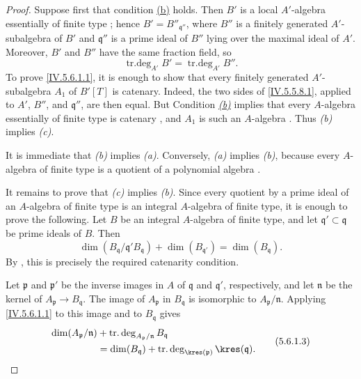 \begin{proof}
Suppose first that condition
{\hyperref[IV.5.6.1.b]{\textup{(b)}}} holds.  Then $B'$ is a local
$A'$-algebra essentially of finite type ; hence $B'=B''_{\mathfrak q''}$,
where $B''$ is a finitely generated $A'$-subalgebra of $B'$ and
$\mathfrak q''$ is a prime ideal of $B''$ lying over the maximal
ideal of $A'$.  Moreover, $B'$ and $B''$ have the same fraction
field, so
\[
\operatorname{tr.deg}_{A'}B'
 =\operatorname{tr.deg}_{A'}B''.
\]
To prove \eqref{IV.5.6.1.1}, it is enough to show that every
finitely generated $A'$-subalgebra $A_1$ of $B'[T]$ is catenary.
Indeed, the two sides of \eqref{IV.5.5.8.1}, applied to $A'$, $B''$,
and $\mathfrak q''$, are then equal.  But
Condition {\hyperref[IV.5.6.1.b]{\emph{(b)}}} implies that every
$A$-algebra essentially of
finite type is catenary , and $A_1$ is such an
$A$-algebra .  Thus \emph{(b)} implies \emph{(c)}.

It is immediate that \emph{(b)} implies \emph{(a)}.  Conversely, \emph{(a)} implies \emph{(b)},
because every $A$-algebra of finite type is a quotient of a
polynomial algebra .

It remains to prove that \emph{(c)} implies \emph{(b)}.  Since every quotient by a
prime ideal of an $A$-algebra of finite type is an integral
$A$-algebra of finite type, it is enough to prove the following.
Let $B$ be an integral $A$-algebra of finite type, and let
$\mathfrak q'\subset\mathfrak q$ be prime ideals of $B$.  Then
\begin{equation}
\dim(B_{\mathfrak q}/\mathfrak q'B_{\mathfrak q})
 +\dim(B_{\mathfrak q'})
 =\dim(B_{\mathfrak q}).
\tag{5.6.1.2}\label{IV.5.6.1.2}
\end{equation}
By , this is precisely the required catenarity
condition.


Let $\mathfrak p$ and $\mathfrak p'$ be the inverse images in $A$ of
$\mathfrak q$ and $\mathfrak q'$, respectively, and let
$\mathfrak n$ be the kernel of $A_{\mathfrak p}\longrightarrow B_{\mathfrak q}$.
The image of $A_{\mathfrak p}$ in $B_{\mathfrak q}$ is isomorphic to
$A_{\mathfrak p}/\mathfrak n$.  Applying
\eqref{IV.5.6.1.1} to this image and to $B_{\mathfrak q}$ gives
\begin{equation}
\begin{split}
\dim(A_{\mathfrak p}/\mathfrak n)
 &+\operatorname{tr.deg}_{A_{\mathfrak p}/\mathfrak n}
       B_{\mathfrak q}\\
 &=\dim(B_{\mathfrak q})
   +\operatorname{tr.deg}_{\kres(\mathfrak p)}
       \kres(\mathfrak q).
\end{split}
\tag{5.6.1.3}\label{IV.5.6.1.3}
\end{equation}


\end{proof}
